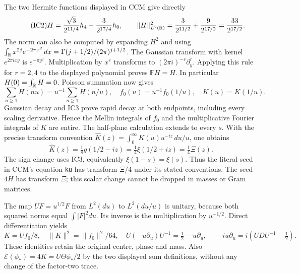 The two Hermite functions displayed in CCM give directly
\begin{equation}\tag{IC2}
 H=\frac{\sqrt3}{2^{11/4}}h_4-\frac3{2^{17/4}}h_0,
 \qquad \|H\|_{L^2(\mathbb R)}^2=\frac3{2^{11/2}}+\frac9{2^{17/2}}
 =\frac{33}{2^{17/2}}.
\end{equation}
The norm can also be computed by expanding $H^2$ and using
$\int_{\mathbb R}x^{2j}e^{-2\pi x^2}\,dx
=\Gamma(j+1/2)/(2\pi)^{j+1/2}$.
The Gaussian transform with kernel $e^{2\pi ixy}$ is
$e^{-\pi y^2}$. Multiplication by $x^r$ transforms to
$(2\pi i)^{-r}\partial_y^r$. Applying this rule for $r=2,4$
to the displayed polynomial proves $\mathbb FH=H$.
In particular $H(0)=\int_\mathbb R H=0$. Poisson summation now gives
\begin{equation}\tag{IC3}
 \sum_{n\ge1}H(nu)=u^{-1}\sum_{n\ge1}H(n/u),
 \quad f_0(u)=u^{-1}f_0(1/u),\quad K(u)=K(1/u).
\end{equation}
Gaussian decay and IC3 prove rapid decay at both endpoints,
including every scaling derivative. Hence the Mellin integrals
of $f_0$ and the multiplicative Fourier integrals of $K$ are entire.
The half-plane calculation extends to every $s$.
With the precise transform convention
$\widehat K(z)=\int_0^\infty K(u)u^{-iz}\,du/u$, one obtains
\begin{equation}\tag{IC4}
 \widehat K(z)=\tfrac18g(1/2-iz)
 =\tfrac14\xi(1/2+iz)=\tfrac14\Xi(z).
\end{equation}
The sign change uses IC3, equivalently $\xi(1-s)=\xi(s)$.
Thus the literal seed in CCM's equation \texttt{ku} has transform
$\Xi/4$ under its stated conventions. The seed $4H$ has transform
$\Xi$; this scalar change cannot be dropped in masses or Gram matrices.

The map $UF=u^{1/2}F$ from $L^2(du)$ to $L^2(du/u)$ is unitary,
because both squared norms equal $\int|F|^2du$. Its inverse is
the multiplication by $u^{-1/2}$. Direct differentiation yields
\begin{equation}\tag{IC5}
 K=Uf_0/8,\quad \|K\|^2=\|f_0\|^2/64,\quad
 U(-u\partial_u)U^{-1}=\tfrac12-u\partial_u,
 \quad -iu\partial_u=i(U D U^{-1}-\tfrac12).
\end{equation}
These identities retain the original centre, phase and mass.
Also $\mathcal E(\phi_*)=4K=U\Theta\phi_*/2$ by the two displayed
sum definitions, without any change of the factor-two trace.

